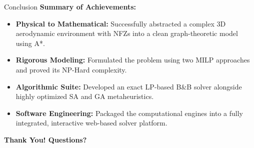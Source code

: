 \documentclass[11pt,aspectratio=169]{beamer}
\begin{document}
\begin{frame}{Conclusion}
    \textbf{Summary of Achievements:}
    \vspace{0.3cm}
    \begin{itemize}
        \item \textbf{Physical to Mathematical:} Successfully abstracted a complex 3D aerodynamic environment with NFZs into a clean graph-theoretic model using A*.
        \item \textbf{Rigorous Modeling:} Formulated the problem using two MILP approaches and proved its NP-Hard complexity.
        \item \textbf{Algorithmic Suite:} Developed an exact LP-based B\&B solver alongside highly optimized SA and GA metaheuristics.
        \item \textbf{Software Engineering:} Packaged the computational engines into a fully integrated, interactive web-based solver platform.
    \end{itemize}
    
    \vspace{0.5cm}
    \begin{center}
        \textbf{Thank You! Questions?}
    \end{center}
\end{frame}
\end{document}
